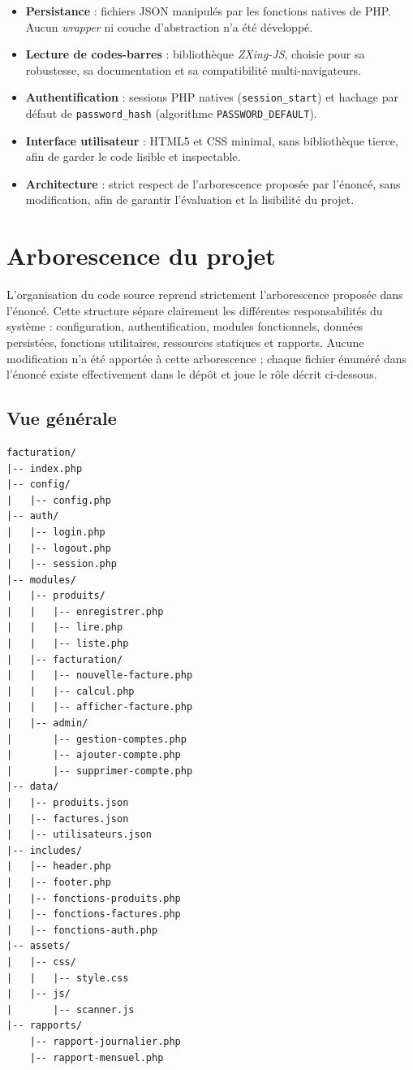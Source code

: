 \documentclass[12pt,a4paper]{article}
\begin{document}
\begin{itemize}[leftmargin=1.5em]
    \item \textbf{Persistance} : fichiers JSON manipulés par les fonctions natives de PHP. Aucun \textit{wrapper} ni couche d'abstraction n'a été développé.
    \item \textbf{Lecture de codes-barres} : bibliothèque \textit{ZXing-JS}, choisie pour sa robustesse, sa documentation et sa compatibilité multi-navigateurs.
    \item \textbf{Authentification} : sessions PHP natives (\texttt{session\_start}) et hachage par défaut de \texttt{password\_hash} (algorithme \texttt{PASSWORD\_DEFAULT}).
    \item \textbf{Interface utilisateur} : HTML5 et CSS minimal, sans bibliothèque tierce, afin de garder le code lisible et inspectable.
    \item \textbf{Architecture} : strict respect de l'arborescence proposée par l'énoncé, sans modification, afin de garantir l'évaluation et la lisibilité du projet.
\end{itemize}

\section{Arborescence du projet}
\label{sec:arborescence}

L'organisation du code source reprend strictement l'arborescence proposée dans l'énoncé. Cette structure sépare clairement les différentes responsabilités du système : configuration, authentification, modules fonctionnels, données persistées, fonctions utilitaires, ressources statiques et rapports. Aucune modification n'a été apportée à cette arborescence ; chaque fichier énuméré dans l'énoncé existe effectivement dans le dépôt et joue le rôle décrit ci-dessous.

\subsection{Vue générale}

\begin{lstlisting}[basicstyle=\ttfamily\small, frame=single, backgroundcolor=\color{codebg}]
facturation/
|-- index.php
|-- config/
|   |-- config.php
|-- auth/
|   |-- login.php
|   |-- logout.php
|   |-- session.php
|-- modules/
|   |-- produits/
|   |   |-- enregistrer.php
|   |   |-- lire.php
|   |   |-- liste.php
|   |-- facturation/
|   |   |-- nouvelle-facture.php
|   |   |-- calcul.php
|   |   |-- afficher-facture.php
|   |-- admin/
|       |-- gestion-comptes.php
|       |-- ajouter-compte.php
|       |-- supprimer-compte.php
|-- data/
|   |-- produits.json
|   |-- factures.json
|   |-- utilisateurs.json
|-- includes/
|   |-- header.php
|   |-- footer.php
|   |-- fonctions-produits.php
|   |-- fonctions-factures.php
|   |-- fonctions-auth.php
|-- assets/
|   |-- css/
|   |   |-- style.css
|   |-- js/
|       |-- scanner.js
|-- rapports/
    |-- rapport-journalier.php
    |-- rapport-mensuel.php
\end{lstlisting}
\end{document}
